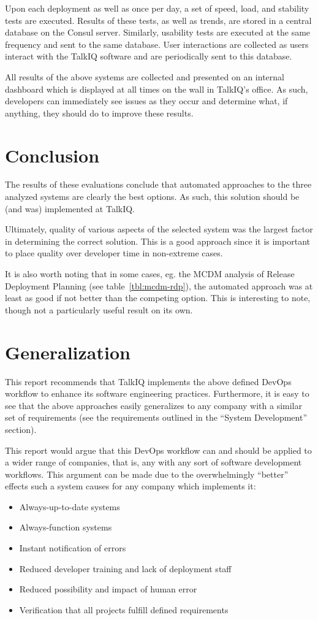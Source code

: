 \documentclass[12pt]{article}
\begin{document}
Upon each deployment as well as once per day, a set of speed, load, and stability tests are executed. Results of these tests, as well as trends, are stored in a central database on the Consul server. Similarly, usability tests are executed at the same frequency and sent to the same database. User interactions are collected as users interact with the TalkIQ software and are periodically sent to this database.

All results of the above systems are collected and presented on an internal dashboard which is displayed at all times on the wall in TalkIQ's office. As such, developers can immediately see issues as they occur and determine what, if anything, they should do to improve these results.
\newpage


\section{Conclusion}
The results of these evaluations conclude that automated approaches to the three analyzed systems are clearly the best options. As such, this solution should be (and was) implemented at TalkIQ.

Ultimately, quality of various aspects of the selected system was the largest factor in determining the correct solution. This is a good approach since it is important to place quality over developer time in non-extreme cases.

It is also worth noting that in some cases, eg. the MCDM analysis of Release Deployment Planning (see table~\ref{tbl:mcdm-rdp}), the automated approach was at least as good if not better than the competing option. This is interesting to note, though not a particularly useful result on its own.
\newpage


\section{Generalization}
This report recommends that TalkIQ implements the above defined DevOps workflow to enhance its software engineering practices. Furthermore, it is easy to see that the above approaches easily generalizes to any company with a similar set of requirements (see the requirements outlined in the ``System Development'' section).

This report would argue that this DevOps workflow can and should be applied to a wider range of companies, that is, any with any sort of software development workflows. This argument can be made due to the overwhelmingly ``better'' effects such a system causes for any company which implements it:
\begin{itemize}
\item Always-up-to-date systems
\item Always-function systems
\item Instant notification of errors
\item Reduced developer training and lack of deployment staff
\item Reduced possibility and impact of human error
\item Verification that all projects fulfill defined requirements
\end{itemize}
\end{document}
